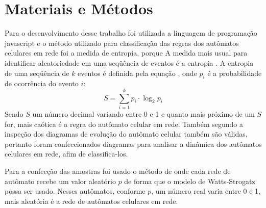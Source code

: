 
\chapter{Materiais e Métodos}
\label{chap:materiaisemetodos}
Para o desenvolvimento desse trabalho foi utilizada a linguagem de programação javascript e o método utilizado para classificação das regras dos autômatos celulares em rede foi a medida de entropia, porque A  medida  mais  usual  para  identificar aleatoriedade em  uma  seqüência  de  eventos é a entropia \cite{hevertonAutomatoRede}. A entropia de uma seqüência de $k$ eventos é definida pela equação , onde $p_i$  é a probabilidade de ocorrência do evento $i$: 
$$ S = \sum_{i=1}^{k} p_i \cdot \log_2 p_i$$
Sendo $S$ um número decimal variando entre 0 e 1 e quanto mais próximo de um $S$ for, mais caótica é a regra do autômato celular em rede. Também segundo \cite{wolframtheoryandapplications} a inspeção dos diagramas de evolução do autômato celular também são válidas, portanto foram confeccionados diagramas para analisar a dinâmica dos autômatos celulares em rede, afim de classifica-los.

Para a confecção das amostras foi usado o método de \cite{smallworld} onde cada rede de autômato recebe um valor aleatório $p$ de forma que o modelo de Watts-Strogatz possa ser usado. Nesses autômatos, conforme $p$, um número real varia entre 0 e 1, mais aleatória é a rede de autômatos celulares em rede. 


